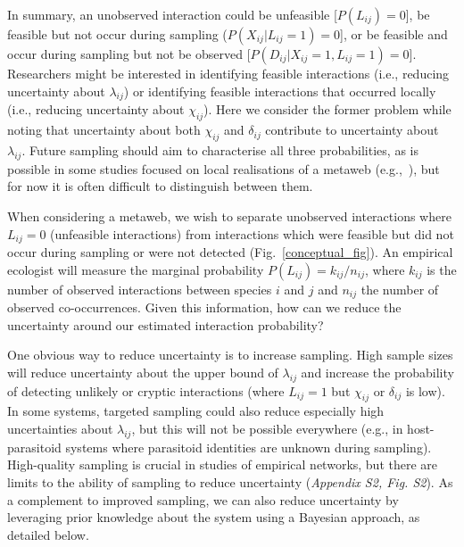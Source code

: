 \documentclass[12pt]{article}
\begin{document}
\begin{spacing}{1.5}

    In summary, an unobserved interaction could be unfeasible [$P(L_{ij})=0$], be feasible but not occur during sampling ($P(X_{ij}|L_{ij}=1)=0$], or be feasible and occur during sampling but not be observed [$P(D_{ij}|X_{ij}=1,L_{ij}=1)=0$]. Researchers might be interested in identifying feasible interactions (i.e., reducing uncertainty about $\lambda_{ij}$) or identifying feasible interactions that occurred locally (i.e., reducing uncertainty about $\chi_{ij}$). Here we consider the former problem while noting that uncertainty about both $\chi_{ij}$ and $\delta_{ij}$ contribute to uncertainty about $\lambda_{ij}$. Future sampling should aim to characterise all three probabilities, as is possible in some studies focused on local realisations of a metaweb (e.g.,~\citet{Graham2018,Gravel2018}), but for now it is often difficult to distinguish between them.


    When considering a metaweb, we wish to separate unobserved interactions where $L_{ij}=0$ (unfeasible interactions) from interactions which were feasible but did not occur during sampling or were not detected (Fig.~\ref{conceptual_fig}). An empirical ecologist will measure the marginal probability $P(L_{ij})=k_{ij}/n_{ij}$, where $k_{ij}$ is the number of observed interactions between species $i$ and $j$ and $n_{ij}$ the number of observed co-occurrences. Given this information, how can we reduce the uncertainty around our estimated interaction probability?


    One obvious way to reduce uncertainty is to increase sampling. High sample sizes will reduce uncertainty about the upper bound of $\lambda_{ij}$ and increase the probability of detecting unlikely or cryptic interactions (where $L_{ij}=1$ but $\chi_{ij}$ or $\delta_{ij}$ is low). In some systems, targeted sampling could also reduce especially high uncertainties about $\lambda_{ij}$, but this will not be possible everywhere (e.g., in host-parasitoid systems where parasitoid identities are unknown during sampling). High-quality sampling is crucial in studies of empirical networks, but there are limits to the ability of sampling to reduce uncertainty (\emph{Appendix S2, Fig. S2}). As a complement to improved sampling, we can also reduce uncertainty by leveraging prior knowledge about the system using a Bayesian approach, as detailed below.



\end{spacing}
\end{document}

